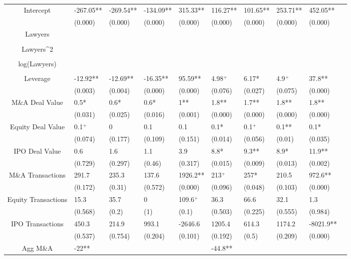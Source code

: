 \documentclass{article}
\begin{document}
\begin{table}[H]
\begin{tabular}{|clllllllll|}
Intercept & -267.05** & -269.54** & -134.09** & 315.33** & 116.27** & 101.65** & 253.71** & 452.05** & \\ 
   & (0.000) & (0.000) & (0.000) & (0.000) & (0.000) & (0.000) & (0.000) & (0.000) & \\ 
  Lawyers &  &  &  &  &  &  &  &  & \\ 
   &  &  &  &  &  &  &  &  & \\ 
  Lawyers^2 &  &  &  &  &  &  &  &  & \\ 
   &  &  &  &  &  &  &  &  & \\ 
  log(Lawyers) &  &  &  &  &  &  &  &  & \\ 
   &  &  &  &  &  &  &  &  & \\ 
  Leverage & -12.92** & -12.69** & -16.35** & 95.59** & 4.98$^{+}$ & 6.17* & 4.9$^{+}$ & 37.8** & \\ 
   & (0.003) & (0.004) & (0.000) & (0.000) & (0.076) & (0.027) & (0.075) & (0.000) & \\ 
  M\&A Deal Value & 0.5* & 0.6* & 0.6* & 1** & 1.8** & 1.7** & 1.8** & 1.8** & \\ 
   & (0.031) & (0.025) & (0.016) & (0.001) & (0.000) & (0.000) & (0.000) & (0.000) & \\ 
  Equity Deal Value & 0.1$^{+}$ & 0 & 0.1 & 0.1 & 0.1* & 0.1$^{+}$ & 0.1** & 0.1* & \\ 
   & (0.074) & (0.177) & (0.109) & (0.151) & (0.014) & (0.056) & (0.01) & (0.035) & \\ 
  IPO Deal Value & 0.6 & 1.6 & 1.1 & 3.9 & 8.8* & 9.3** & 8.9* & 11.9** & \\ 
   & (0.729) & (0.297) & (0.46) & (0.317) & (0.015) & (0.009) & (0.013) & (0.002) & \\ 
  M\&A Transactions & 291.7 & 235.3 & 137.6 & 1926.2** & 213$^{+}$ & 257* & 210.5 & 972.6** & \\ 
   & (0.172) & (0.31) & (0.572) & (0.000) & (0.096) & (0.048) & (0.103) & (0.000) & \\ 
  Equity Transactions & 15.3 & 35.7 & 0 & 109.6$^{+}$ & 36.3 & 66.6 & 32.1 & 1.3 & \\ 
   & (0.568) & (0.2) & (1) & (0.1) & (0.503) & (0.225) & (0.555) & (0.984) & \\ 
  IPO Transactions & 450.3 & 214.9 & 993.1 & -2646.6 & 1205.4 & 614.3 & 1174.2 & -8021.9** & \\ 
   & (0.537) & (0.754) & (0.204) & (0.101) & (0.192) & (0.5) & (0.209) & (0.000) & \\ 
  Agg M\&A & -22** &  &  &  & -44.8** &  &  &  & \\ 

\end{tabular}
\end{table}
\end{document}
